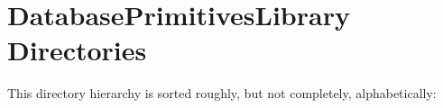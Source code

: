 \section{Database\-Primitives\-Library Directories}
This directory hierarchy is sorted roughly, but not completely, alphabetically:\begin{CompactList}
\item {}
\end{CompactList}
